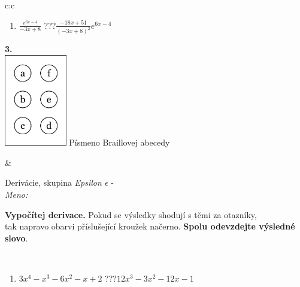 \documentclass[10pt]{report}
\begin{document}
\begin{tabular}{c:c}
\begin{minipage}[c][104.5mm][t]{0.5\linewidth}
\begin{center}
\begin{minipage}{0.79\linewidth}
\begin{center}
\begin{varwidth}{\linewidth}
\begin{enumerate}
\item $\frac{e^{6x-4}}{-3x+8}$\quad \dotfill\; ???\;\dotfill \quad $\frac{-18x+51}{(-3x+8)^2}e^{6x-4}$
\end{enumerate}
\end{varwidth}
\end{center}
\end{minipage}
\begin{minipage}{0.20\linewidth}
\begin{center}
{\Huge\bfseries 3.} \\[2mm]
\includegraphics[height=40mm]{../images/braille.png}
{\small Písmeno Braillovej abecedy}
\end{center}
\end{minipage}
\end{center}
\end{minipage}
&
\begin{minipage}[c][104.5mm][t]{0.5\linewidth}
\begin{center}
\vspace{7mm}
{\huge Derivácie, skupina \textit{Epsilon $\epsilon$} -}\\[5mm]
\textit{Meno:}\phantom{xxxxxxxxxxxxxxxxxxxxxxxxxxxxxxxxxxxxxxxxxxxxxxxxxxxxxxxxxxxxxxxxx}\\[5mm]
\begin{minipage}{0.95\linewidth}
\begin{center}
\textbf{Vypočítej derivace.} Pokud se výsledky shodují s těmi za otazníky,\\tak napravo obarvi příslušející kroužek načerno. \textbf{Spolu odevzdejte výsledné slovo}.
\end{center}
\end{minipage}
\\[1mm]
\begin{minipage}{0.79\linewidth}
\begin{center}
\begin{varwidth}{\linewidth}
\begin{enumerate}
\normalsize
\item $3x^4-x^3-6x^2-x+2$\quad \dotfill\; ???\;\dotfill \quad $12x^3-3x^2-12x-1$

\end{enumerate}
\end{varwidth}
\end{center}
\end{minipage}
\end{center}
\end{minipage}
\end{tabular}
\end{document}
